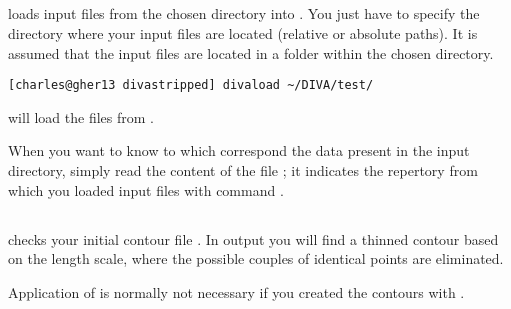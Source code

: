 \subsection{\label{sec:divaload}}

 loads input files from the chosen directory into . You just have to specify the directory where your input files are located (relative or absolute paths). It is assumed that the input files are located in a folder  within the chosen directory.

\example
\begin{lstlisting}[style=Bash]
[charles@gher13 divastripped] divaload ~/DIVA/test/
\end{lstlisting}
will load the files from .
 

\btips
When you want to know to which correspond the data present in the input directory, simply read the content of the file ; it indicates the repertory from which you loaded input files with command .
\etips


\subsection{}

 checks your initial contour file . In output  you will find a thinned contour based on the length scale, where the possible couples of identical points are eliminated.

Application of  is normally not necessary if you created the contours with .
